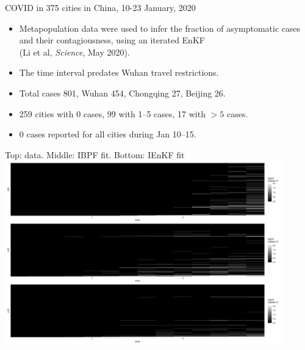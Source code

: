 \documentclass{beamer}
\begin{document}

\begin{frame}{COVID in 375 cities in China, 10-23 January, 2020}

  \begin{itemize}
  \item Metapopulation data were used to infer the fraction of asymptomatic cases and their contagiousness, using an iterated EnKF \\
    (Li et al, {\it Science}, May 2020).
   \item
    The time interval predates Wuhan travel restrictions.
   \item Total cases 801, Wuhan 454, Chongqing 27, Beijing 26.
   \item{} 259 cities with 0 cases, 99 with 1--5 cases, 17 with $>5$ cases.
   \item{} 0 cases reported for all cities during Jan 10--15.

\end{itemize}     

\end{frame}

\begin{frame}{Top: data. Middle: IBPF fit. Bottom: IEnKF fit} 
\includegraphics[width=12cm]{covid/3-panel.pdf}
\end{frame}
\end{document}
